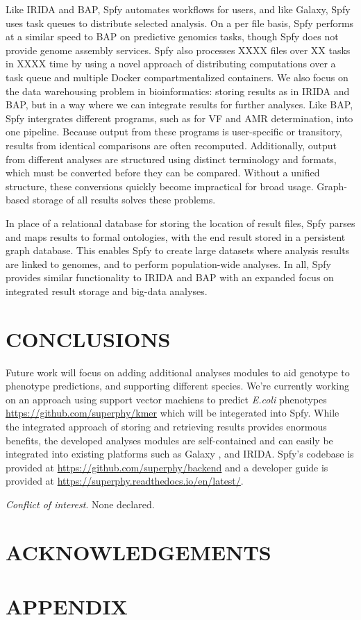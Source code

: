 \documentclass{article}
\begin{document}
Like IRIDA and BAP, Spfy automates workflows for users, and like Galaxy, Spfy uses task queues to distribute selected analysis.
On a per file basis, Spfy performs at a similar speed to BAP on predictive genomics tasks, though Spfy does not provide genome assembly services.
Spfy also processes XXXX files over XX tasks in XXXX time by using a novel approach of distributing computations over a task queue and multiple Docker compartmentalized containers.
We also focus on the data warehousing problem in bioinformatics: storing results as in IRIDA and BAP, but in a way where we can integrate results for further analyses.
Like BAP, Spfy intergrates different programs, such as for VF and AMR determination, into one pipeline. 
Because output from these programs is user-specific or transitory, results from identical comparisons are often recomputed. Additionally, output from different analyses are structured using distinct terminology and formats, which must be converted before they can be compared. Without a unified structure, these conversions quickly become impractical for broad usage. Graph-based storage of all results solves these problems.

In place of a relational database for storing the location of result files, Spfy parses and maps results to formal ontologies, with the end result stored in a persistent graph database.
This enables Spfy to create large datasets where analysis results are linked to genomes, and to perform population-wide analyses. In all, Spfy provides similar functionality to IRIDA and BAP with an expanded focus on integrated result storage and big-data analyses.

\section{CONCLUSIONS}

Future work will focus on adding additional analyses modules to aid genotype to phenotype predictions, and supporting different species. We're currently working on an approach using support vector machiens to predict \textit{E.coli} phenotypes \url{https://github.com/superphy/kmer} which will be integerated into Spfy. While the integrated approach of storing and retrieving results provides enormous benefits, the developed analyses modules are self-contained and can easily be integrated into existing platforms such as Galaxy \cite{goecks2010galaxy}, and IRIDA. Spfy's codebase is provided at \url{https://github.com/superphy/backend} and a developer guide is provided at \url{https://superphy.readthedocs.io/en/latest/}.

\textit{Conflict of interest}. None declared.

\section{ACKNOWLEDGEMENTS}

\newpage




\newpage

\section{APPENDIX}
\end{document}
